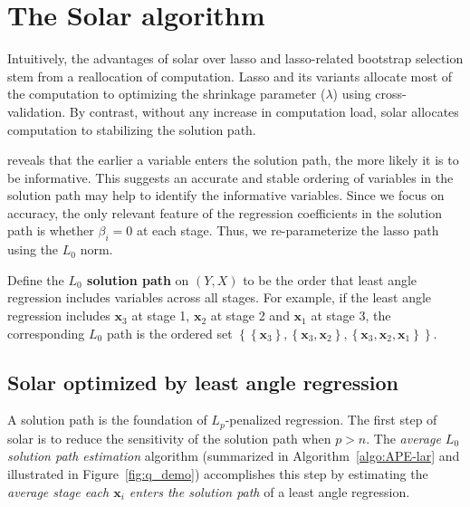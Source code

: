 \documentclass[11pt,review,authoryear]{elsarticle}
\begin{document}

\section{The Solar algorithm \label{section:algo}}

Intuitively, the advantages of solar over lasso and lasso-related bootstrap selection stem from a reallocation of computation. Lasso and its variants allocate most of the computation to optimizing the shrinkage parameter ($\lambda$) using cross-validation. By contrast, without any increase in computation load, solar allocates computation to stabilizing the solution path.

\citet[Theorem~2]{zhang09} reveals that the earlier a variable enters the solution path, the more likely it is to be informative. This suggests an accurate and stable ordering of variables in the solution path may help to identify the informative variables. Since we focus on accuracy, the only relevant feature of the regression coefficients in the solution path is whether $\beta_i = 0$ at each stage. Thus, we re-parameterize the lasso path using the $L_0$ norm.
%
\begin{definition}
  Define the \textbf{$L_0$ solution path} on $\left( Y, X \right)$ to be the order that least angle regression includes variables across all stages. For example, if the least angle regression includes $\mathbf{x}_3$ at stage 1, $\mathbf{x}_2$ at stage 2 and $\mathbf{x}_1$ at stage 3, the corresponding $L_0$ path is the ordered set $\left\{ \left\{\mathbf{x}_3 \right\}, \left\{ \mathbf{x}_3, \mathbf{x}_2 \right\}, \left\{ \mathbf{x}_3, \mathbf{x}_2, \mathbf{x}_1 \right\} \right\}$.
  \label{def:solution_path}
\end{definition}

\subsection{Solar optimized by least angle regression}

A solution path is the foundation of $L_p$-penalized regression. The first step of solar is to reduce the sensitivity of the solution path when $p > n$. The \emph{average $L_0$ solution path estimation} algorithm (summarized in Algorithm~\ref{algo:APE-lar} and illustrated in Figure~\ref{fig:q_demo}) accomplishes this step by estimating the \emph{average stage each $\mathbf{x}_i$ enters the solution path} of a least angle regression.
\end{document}
